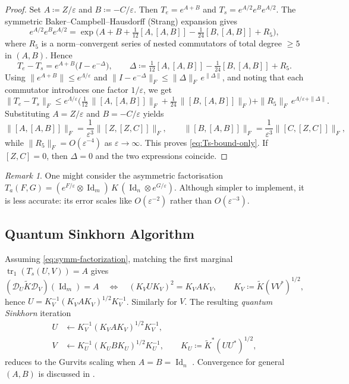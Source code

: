 \documentclass[10pt]{article}
\newcommand{\Id}{\operatorname{Id}}
\newcommand{\tr}{\operatorname{tr}}
\renewcommand{\epsilon}{\varepsilon}
\newcommand{\Ko}{\widetilde{K}}
\theoremstyle{plain}
\theoremstyle{definition}
\theoremstyle{remark}
\newtheorem{rem}{Remark}
\begin{document}
\begin{proof}
Set $A\coloneqq Z/\epsilon$ and $B\coloneqq -C/\epsilon$. Then $T_e=e^{A+B}$ and $T_s=e^{A/2}e^{B}e^{A/2}$. The symmetric Baker--Campbell--Hausdorff (Strang) expansion gives
\[
e^{A/2}e^{B}e^{A/2}
=\exp\Big(A+B+\tfrac{1}{12}[A,[A,B]]-\tfrac{1}{24}[B,[A,B]]+R_5\Big),
\]
where $R_5$ is a norm--convergent series of nested commutators of total degree $\ge 5$ in $(A,B)$. Hence
\[
T_e-T_s=e^{A+B}\big(I-e^{-\Delta}\big),
\qquad
\Delta\coloneqq \tfrac{1}{12}[A,[A,B]]-\tfrac{1}{24}[B,[A,B]]+R_5.
\]
Using $\|e^{A+B}\|\le e^{\Lambda/\epsilon}$ and $\|I-e^{-\Delta}\|_F\le \|\Delta\|_F\,e^{\|\Delta\|}$, and noting that each commutator introduces one factor $1/\epsilon$, we get
\[
\|T_e-T_s\|_F
\le e^{\Lambda/\epsilon}\Big(
\tfrac{1}{12}\,\|[A,[A,B]]\|_F
+\tfrac{1}{24}\,\|[B,[A,B]]\|_F\Big)+\|R_5\|_F\,e^{\Lambda/\epsilon+\|\Delta\|}.
\]
Substituting $A=Z/\epsilon$ and $B=-C/\epsilon$ yields
\[
\|[A,[A,B]]\|_F=\frac{1}{\epsilon^{3}}\|[Z,[Z,C]]\|_F,
\qquad
\|[B,[A,B]]\|_F=\frac{1}{\epsilon^{3}}\|[C,[Z,C]]\|_F,
\]
while $\|R_5\|_F=O(\epsilon^{-4})$ as $\epsilon\to\infty$. This proves \eqref{eq:Ts-bound-only}. If $[Z,C]=0$, then $\Delta=0$ and the two expressions coincide.
\end{proof}

\begin{rem}
One might consider the asymmetric factorisation
$T_a(F,G)=(e^{F/\epsilon}\otimes \Id_m)\,K\,(\Id_n\otimes e^{G/\epsilon})$.
Although simpler to implement, it is less accurate: its error scales like $O(\epsilon^{-2})$ rather than $O(\epsilon^{-3})$.
\end{rem}


\subsection{Quantum Sinkhorn Algorithm}

Assuming \eqref{eq:symm-factorization}, matching the first marginal $\tr_1(T_s(U,V))=A$ gives
\[
(\mathcal{D}_U\Ko\mathcal{D}_V)(\Id_m)=A
\quad\Longleftrightarrow\quad
(K_VUK_V)^2=K_VAK_V,\qquad 
K_V\coloneqq\Ko(VV^{*})^{1/2},
\]
hence $U=K_V^{-1}(K_VAK_V)^{1/2}K_V^{-1}$.
Similarly for $V$.  
The resulting \emph{quantum Sinkhorn} iteration
\[
\begin{aligned}
U &\leftarrow K_V^{-1}(K_VAK_V)^{1/2}K_V^{-1},\\
V &\leftarrow K_U^{-1}(K_UBK_U)^{1/2}K_U^{-1},\qquad 
K_U\coloneqq\Ko^{*}(UU^{*})^{1/2},
\end{aligned}
\]
reduces to the Gurvits scaling when $A=B=\Id_n$ \cite{gurvits2003classical}.  
Convergence for general $(A,B)$ is discussed in \cite{georgiou2015positive}.
\end{document}

